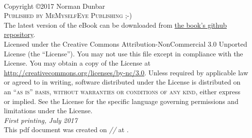 \documentclass[11pt,fleqn]{book} %
\begin{document}



\newpage
~\vfill
\thispagestyle{empty}

\noindent Copyright \copyright 2017 Norman Dunbar\\ %

\noindent \textsc{Published by MeMyselfEye Publishing ;-)}\\ %

\noindent The latest version of the eBook can be downloaded from \href{https://github.com/NormanDunbar/OracleTraceFilesExplained}{the book's github repository}.\\ %

\noindent Licensed under the Creative Commons Attribution-NonCommercial 3.0 Unported License (the ``License''). You may not use this file except in compliance with the License. You may obtain a copy of the License at \url{http://creativecommons.org/licenses/by-nc/3.0}. Unless required by applicable law or agreed to in writing, software distributed under the License is distributed on an \textsc{``as is'' basis, without warranties or conditions of any kind}, either express or implied. See the License for the specific language governing permissions and limitations under the License.\\ %

\noindent \textit{First printing, July 2017} \\%


\noindent This pdf document was created on \textit{\the\day/\the\month/\the\year} at \textit{\DTMcurrenttime}.



\pagestyle{empty} %
\end{document}
